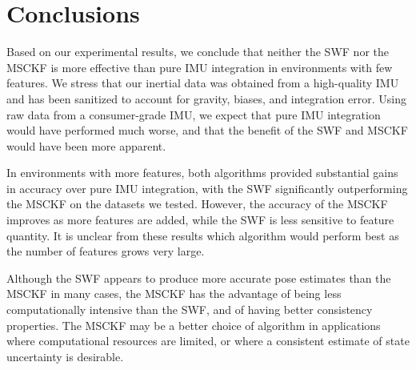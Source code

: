 \documentclass[letterpaper, 10 pt, conference]{ieeeconf}  %
\begin{document}
\section{Conclusions} \label{sec:conclusions}
Based on our experimental results, we conclude that neither the SWF nor the MSCKF is more effective than pure IMU integration in environments with few features.
We stress that our inertial data was obtained from a high-quality IMU and has been sanitized to account for gravity, biases, and integration error.
Using raw data from a consumer-grade IMU, we expect that pure IMU integration would have performed much worse, and that the benefit of the SWF and MSCKF would have been more apparent.

In environments with more features, both algorithms provided substantial gains in accuracy over pure IMU integration, with the SWF significantly outperforming the MSCKF on the datasets we tested.
However, the accuracy of the MSCKF improves as more features are added, while the SWF is less sensitive to feature quantity.
It is unclear from these results which algorithm would perform best as the number of features grows very large.

Although the SWF appears to produce more accurate pose estimates than the MSCKF in many cases, the MSCKF has the advantage of being less computationally intensive than the SWF, and of having better consistency properties.
The MSCKF may be a better choice of algorithm in applications where computational resources are limited, or where a consistent estimate of state uncertainty is desirable.


\def\url#1{} %


\end{document}
